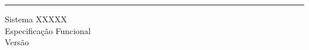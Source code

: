 \begin{flushright}
    \rule{16cm}{5pt}\vskip1cm
    \begin{bfseries}
        \vspace{8cm}
        \Huge{Sistema XXXXX\\Especificação Funcional}\\
        \vspace{8cm}
        \LARGE{Versão \myversion}\\
    \end{bfseries}
\end{flushright}